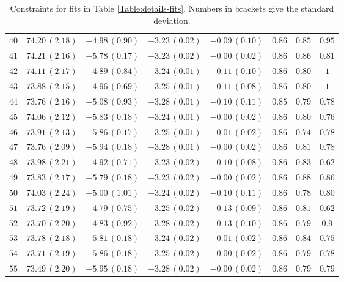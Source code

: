 \begin{table}
{\begin{tabular}{cccccccc}
$ 40 $ & $74.20\,(2.18)$ & $-4.98\,(0.90)$ & $-3.23\,(0.02)$ & $-0.09\,(0.10) $ & $0.86 $ & $ 0.85$ & $ 0.95 $\\
$ 41 $ & $74.21\,(2.16)$ & $-5.78\,(0.17)$ & $-3.23\,(0.02)$ & $-0.00\,(0.02) $ & $0.86 $ & $ 0.86$ & $ 0.81 $\\
$ 42 $ & $74.11\,(2.17)$ & $-4.89\,(0.84)$ & $-3.24\,(0.01)$ & $-0.11\,(0.10) $ & $0.86 $ & $ 0.80$ & $ 1$\\
$ 43 $ & $73.88\,(2.15)$ & $-4.96\,(0.69)$ & $-3.25\,(0.01)$ & $-0.11\,(0.08) $ & $0.86 $ & $ 0.80 $ & $1 $\\
$ 44 $ & $73.76\,(2.16)$ & $-5.08\,(0.93)$ & $-3.28\,(0.01)$ & $-0.10\,(0.11) $ & $0.85 $ & $ 0.79$ & $ 0.78 $\\
$ 45 $ & $74.06\,(2.12)$ & $-5.83\,(0.18)$ & $-3.24\,(0.01)$ & $-0.00\,(0.02) $ & $0.86 $ & $ 0.80$ & $ 0.76 $\\
$ 46 $ & $73.91\,(2.13)$ & $-5.86\,(0.17)$ & $-3.25\,(0.01)$ & $-0.01\,(0.02) $ & $0.86 $ & $ 0.74$ & $ 0.78$\\
$ 47 $ & $73.76\,(2.09)$ & $-5.94\,(0.18)$ & $-3.28\,(0.01)$ & $-0.00\,(0.02) $ & $ 0.86 $ & $0.81 $ & $ 0.78$\\
$ 48 $ & $73.98\,(2.21)$ & $-4.92\,(0.71)$ & $-3.23\,(0.02)$ & $-0.10\,(0.08) $ & $0.86 $ & $0.83 $ & $ 0.62 $\\
$ 49 $ & $73.83\,(2.17)$ & $-5.79\,(0.18)$ & $-3.23\,(0.02)$ & $-0.00\,(0.02) $ & $ 0.86$ & $0.88 $ & $ 0.86 $\\
$ 50 $ & $74.03\,(2.24)$ & $-5.00\,(1.01)$ & $-3.24\,(0.02)$ & $-0.10\,(0.11) $ & $0.86 $ & $0.78 $ & $0.80 $\\
$ 51 $ & $73.72\,(2.19)$ & $-4.79\,(0.75)$ & $-3.25\,(0.02)$ & $-0.13\,(0.09) $ & $ 0.86$ & $0.81 $ & $ 0.62 $\\
$ 52 $ & $73.70\,(2.20)$ & $-4.83\,(0.92)$ & $-3.28\,(0.02)$ & $-0.13\,(0.10) $ & $ 0.86$ & $0.79 $ & $ 0.9$\\
$ 53 $ & $73.78\,(2.18)$ & $-5.81\,(0.18)$ & $-3.24\,(0.02)$ & $-0.01\,(0.02) $ & $ 0.86$ & $ 0.84$ & $ 0.75$\\
$ 54 $ & $73.71\,(2.19)$ & $-5.86\,(0.18)$ & $-3.25\,(0.02)$ & $-0.00\,(0.02) $ & $0.86 $ & $ 0.79 $ & $ 0.78 $\\
$ 55 $ & $73.49\,(2.20)$ & $-5.95\,(0.18)$ & $-3.28\,(0.02)$ & $-0.00\,(0.02) $ & $0.86 $ & $0.79 $ & $ 0.79$\\
\hline
\end{tabular}}
\caption{\label{Table:Constraints-main-analysis} Constraints for fits in Table \ref{Table:details-fits}. Numbers in brackets give the standard deviation.}
\label{Table:Constraints-main-analysis}
\end{table}


